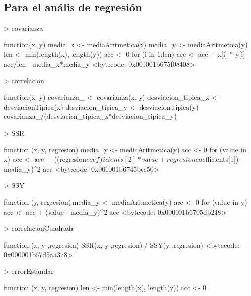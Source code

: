 \documentclass [a4paper] {article}
\begin{document}
\subsection{Para el anális de regresión}
\begin{Schunk}
\begin{Sinput}
> covarianza
\end{Sinput}
\begin{Soutput}
function(x, y) {
  media_x <- mediaAritmetica(x)
  media_y <- mediaAritmetica(y)
  len <- min(length(x), length(y))
  acc <- 0
  for (i in 1:len) {
    acc <- acc + x[i] * y[i]
  }
  acc/len - media_x*media_y
}
<bytecode: 0x000001b675f08408>
\end{Soutput}
\begin{Sinput}
> correlacion
\end{Sinput}
\begin{Soutput}
function(x, y) {
  covarianza_ <- covarianza(x, y)
  desviacion_tipica_x <- desviacionTipica(x)
  desviacion_tipica_y <- desviacionTipica(y)
  covarianza_/(desviacion_tipica_x*desviacion_tipica_y)
}
\end{Soutput}
\begin{Sinput}
> SSR
\end{Sinput}
\begin{Soutput}
function (x, y, regresion){
  media_y <- mediaAritmetica(y)
  acc <- 0
  for (value in x){
    acc <- acc + ((regresion$coefficients[2]*value+regresion$coefficients[1]) - media_y)^2
  }
  acc
}
<bytecode: 0x000001b6745bec50>
\end{Soutput}
\begin{Sinput}
> SSY
\end{Sinput}
\begin{Soutput}
function (y, regresion){
  media_y <- mediaAritmetica(y)
  acc <- 0
  for (value in y){
    acc <- acc + (value - media_y)^2
  }
  acc
}
<bytecode: 0x000001b6705db248>
\end{Soutput}
\begin{Sinput}
> correlacionCuadrada
\end{Sinput}
\begin{Soutput}
function (x, y ,regresion){
  SSR(x, y ,regresion) / SSY(y ,regresion)
}
<bytecode: 0x000001b67d5aa378>
\end{Soutput}
\begin{Sinput}
> errorEstandar
\end{Sinput}
\begin{Soutput}
function (x, y, regresion) {
  len <- min(length(x), length(y))
  acc <- 0
}
\end{Soutput}
\end{Schunk}
\end{document}
